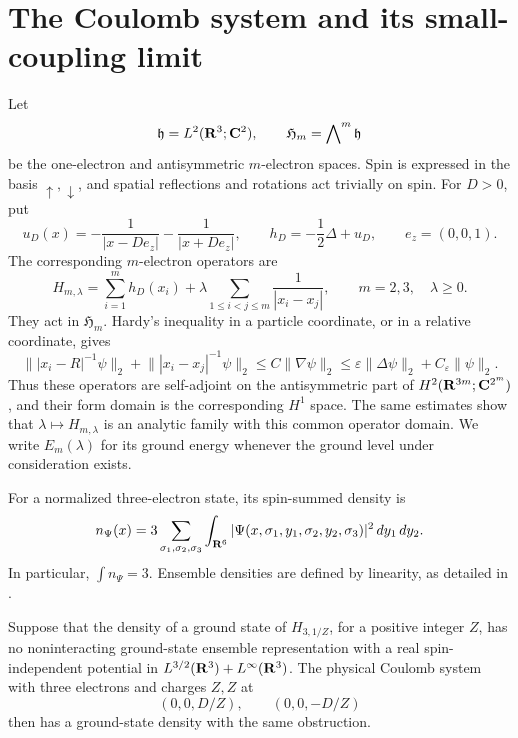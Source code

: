 \section{The Coulomb system and its small-coupling limit}
\label{sec:setup}

Let
\[
 \mathfrak h=L^2(\mathbf R^3;\mathbf C^2),\qquad
 \mathfrak H_m=\bigwedge\nolimits^m\mathfrak h
\]
be the one-electron and antisymmetric \(m\)-electron spaces.  Spin is
expressed in the basis \(\uparrow,\downarrow\), and spatial reflections
and rotations act trivially on spin.  For \(D>0\), put
\begin{equation}
 u_D(x)=-\frac1{|x-De_z|}-\frac1{|x+De_z|},
 \qquad h_D=-\frac12\Delta+u_D,\qquad e_z=(0,0,1).
 \label{eq:unit-charge-potential}
\end{equation}
The corresponding \(m\)-electron operators are
\begin{equation}
 H_{m,\lambda}
 =\sum_{i=1}^m h_D(x_i)
   +\lambda\sum_{1\le i<j\le m}\frac1{|x_i-x_j|},
 \qquad m=2,3,\quad \lambda\ge0 .
 \label{eq:scaled-coulomb-hamiltonian}
\end{equation}
They act in \(\mathfrak H_m\).  Hardy's inequality in a particle
coordinate, or in a relative coordinate, gives
\[
 \bigl\||x_i-R|^{-1}\psi\bigr\|_2+
 \bigl\||x_i-x_j|^{-1}\psi\bigr\|_2
 \le C\|\nabla\psi\|_2
 \le \varepsilon\|\Delta\psi\|_2+C_\varepsilon\|\psi\|_2 .
\]
Thus these operators are self-adjoint on the antisymmetric part of
\(H^2(\mathbf R^{3m};\mathbf C^{2^m})\), and their form domain is the corresponding
\(H^1\) space.  The same estimates show that \(\lambda\mapsto
H_{m,\lambda}\) is an analytic family with this common operator domain.
We write \(E_m(\lambda)\) for its ground energy whenever the ground
level under consideration exists.

For a normalized three-electron state, its spin-summed density is
\begin{equation}
 n_\Psi(x)
 =3\sum_{\sigma_1,\sigma_2,\sigma_3}
   \int_{\mathbf R^6}
   |\Psi(x,\sigma_1,y_1,\sigma_2,y_2,\sigma_3)|^2\,dy_1\,dy_2 .
 \label{eq:density-definition}
\end{equation}
In particular, \(\int n_\Psi=3\).  Ensemble densities are defined by
linearity, as detailed in .

\begin{proposition}
\label{prop:scaling}
Suppose that the density of a ground state of \(H_{3,1/Z}\), for a
positive integer \(Z\), has no noninteracting ground-state ensemble
representation with a real spin-independent potential in
\(L^{3/2}(\mathbf R^3)+L^\infty(\mathbf R^3)\).
The physical Coulomb system with three electrons and charges \(Z,Z\)
at
\[
 (0,0,D/Z),\qquad (0,0,-D/Z)
\]
then has a ground-state density with the same obstruction.
\end{proposition}

